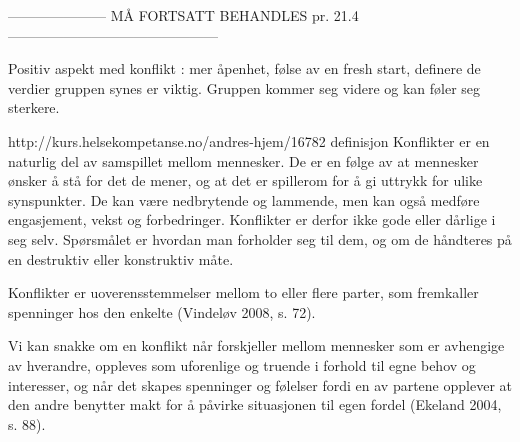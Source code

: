 --------------------- MÅ FORTSATT BEHANDLES  pr. 21.4 ---------------------------------------------


Positiv aspekt med konflikt : mer åpenhet, følse av en fresh start, definere de verdier gruppen synes er viktig. Gruppen kommer seg videre og kan føler seg sterkere. 

http://kurs.helsekompetanse.no/andres-hjem/16782 definisjon 
Konflikter er en naturlig del av samspillet mellom mennesker. De er en følge av at mennesker ønsker å stå for det de mener, og at det er spillerom for å gi uttrykk for ulike synspunkter. De kan være nedbrytende og lammende, men kan også medføre engasjement, vekst og forbedringer. Konflikter er derfor ikke gode eller dårlige i seg selv. Spørsmålet er hvordan man forholder seg til dem, og om de håndteres på en destruktiv eller konstruktiv måte.

Konflikter er uoverensstemmelser mellom to eller flere parter, som fremkaller spenninger hos den enkelte (Vindeløv 2008, s. 72).

Vi kan snakke om en konflikt når forskjeller mellom mennesker som er avhengige av hverandre, oppleves som uforenlige og truende i forhold til egne behov og interesser, og når det skapes spenninger og følelser fordi en av partene opplever at den andre benytter makt for å påvirke situasjonen til egen fordel (Ekeland 2004, s. 88).
